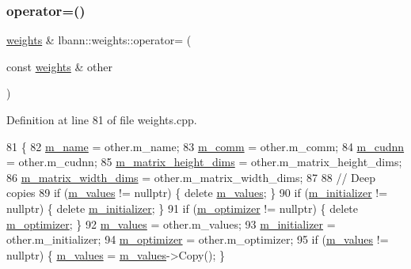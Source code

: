 \subsubsection{\texorpdfstring{operator=()}{operator=()}}
{\footnotesize\ttfamily \hyperlink{classlbann_1_1weights}{weights} \& lbann\+::weights\+::operator= (\begin{DoxyParamCaption}\item[{const \hyperlink{classlbann_1_1weights}{weights} \&}]{other }\end{DoxyParamCaption})}



Definition at line 81 of file weights.\+cpp.


\begin{DoxyCode}
81                                                 \{
82   \hyperlink{classlbann_1_1weights_a08abf0bb29aa47be21bfc7473b4b9b99}{m\_name} = other.m\_name;
83   \hyperlink{classlbann_1_1weights_a223e8907034888392548ae901222b39c}{m\_comm} = other.m\_comm;
84   \hyperlink{classlbann_1_1weights_a873e8c14998915e442d03b8dd7d2fdf7}{m\_cudnn} = other.m\_cudnn;
85   \hyperlink{classlbann_1_1weights_a9287dfbd8a7e4a9f5e0d6371d43ee92f}{m\_matrix\_height\_dims} = other.m\_matrix\_height\_dims;
86   \hyperlink{classlbann_1_1weights_a8317a198bc5b4cd6bee2c806eefd1f12}{m\_matrix\_width\_dims} = other.m\_matrix\_width\_dims;
87 
88   \textcolor{comment}{// Deep copies}
89   \textcolor{keywordflow}{if} (\hyperlink{classlbann_1_1weights_a6b2df671b6d4c4dd595477971eea0543}{m\_values} != \textcolor{keyword}{nullptr})      \{ \textcolor{keyword}{delete} \hyperlink{classlbann_1_1weights_a6b2df671b6d4c4dd595477971eea0543}{m\_values}; \}
90   \textcolor{keywordflow}{if} (\hyperlink{classlbann_1_1weights_a3ddbcce8d543e975efeebdb43e82444c}{m\_initializer} != \textcolor{keyword}{nullptr}) \{ \textcolor{keyword}{delete} \hyperlink{classlbann_1_1weights_a3ddbcce8d543e975efeebdb43e82444c}{m\_initializer}; \}
91   \textcolor{keywordflow}{if} (\hyperlink{classlbann_1_1weights_a5f3b4d4a3ad390c2a9bdbe6c4971de65}{m\_optimizer} != \textcolor{keyword}{nullptr})   \{ \textcolor{keyword}{delete} \hyperlink{classlbann_1_1weights_a5f3b4d4a3ad390c2a9bdbe6c4971de65}{m\_optimizer}; \}
92   \hyperlink{classlbann_1_1weights_a6b2df671b6d4c4dd595477971eea0543}{m\_values} = other.m\_values;
93   \hyperlink{classlbann_1_1weights_a3ddbcce8d543e975efeebdb43e82444c}{m\_initializer} = other.m\_initializer;
94   \hyperlink{classlbann_1_1weights_a5f3b4d4a3ad390c2a9bdbe6c4971de65}{m\_optimizer} = other.m\_optimizer;
95   \textcolor{keywordflow}{if} (\hyperlink{classlbann_1_1weights_a6b2df671b6d4c4dd595477971eea0543}{m\_values} != \textcolor{keyword}{nullptr})      \{ \hyperlink{classlbann_1_1weights_a6b2df671b6d4c4dd595477971eea0543}{m\_values} = \hyperlink{classlbann_1_1weights_a6b2df671b6d4c4dd595477971eea0543}{m\_values}->Copy(); \}

\end{DoxyCode}
